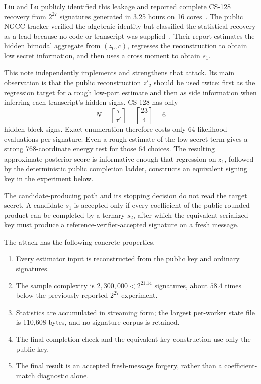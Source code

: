 \documentclass[11pt]{article}
\begin{document}
Liu and Lu publicly identified this leakage and reported complete CS-128 recovery from
$2^{27}$ signatures generated in 3.25 hours on 16 cores~\cite{liu-lu}.  The public NGCC
tracker verified the algebraic identity but classified the statistical recovery as a lead
because no code or transcript was supplied~\cite{ngcc-report}.  Their report estimates the
hidden bimodal aggregate from $(z_0,c)$, regresses the reconstruction to obtain low secret
information, and then uses a cross moment to obtain $s_1$.

This note independently implements and strengthens that attack.  Its main observation is that
the public reconstruction $z'_2$ should be used twice: first as the regression target for a
rough low-part estimate and then as side information when inferring each transcript's hidden
signs.  CS-128 has only
\[
 N=\left\lceil\frac{\tau}{\tau'}\right\rceil
  =\left\lceil\frac{23}{4}\right\rceil=6
\]
hidden block signs.  Exact enumeration therefore costs only 64 likelihood evaluations per
signature.  Even a rough estimate of the low secret term gives a strong 768-coordinate energy
test for those 64 choices.  The resulting approximate-posterior score is informative enough
that regression on $z_1$, followed by the deterministic public completion ladder, constructs
an equivalent signing key in the experiment below.

The candidate-producing path and its stopping decision do not read the target secret.  A
candidate $s_1$ is accepted only if every coefficient of the public rounded product can be
completed by a ternary $s_2$, after which the equivalent serialized key must produce a
reference-verifier-accepted signature on a fresh message.

The attack has the following concrete properties.
\begin{enumerate}[leftmargin=1.7em]
  \item Every estimator input is reconstructed from the public key and ordinary signatures.
  \item The sample complexity is $2{,}300{,}000<2^{21.14}$ signatures, about $58.4$ times
        below the previously reported $2^{27}$ experiment.
  \item Statistics are accumulated in streaming form; the largest per-worker state file is
        110,608 bytes, and no signature corpus is retained.
  \item The final completion check and the equivalent-key construction use only the public key.
  \item The final result is an accepted fresh-message forgery, rather than a coefficient-match
        diagnostic alone.
\end{enumerate}
\end{document}
